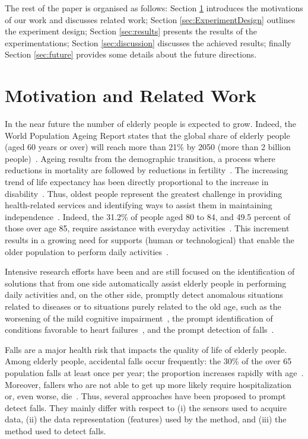 \documentclass[twocolumn]{svjour3}          \smartqed  \usepackage[draft]{hyperref}
\begin{document}
The rest of the paper is organised as follows: Section \ref{sec:related_work} introduces the motivations of our work and discusses related work; Section \ref{sec:ExperimentDesign} outlines the experiment design; Section \ref{sec:results} presents the results of the experimentations; Section \ref{sec:discussion} discusses the achieved results; finally Section \ref{sec:future} provides some details about the future directions. 
\section{Motivation and Related Work}
\label{sec:related_work}

In the near future the number of elderly people is expected to grow. Indeed, the World Population Ageing Report states that the global share of elderly people (aged 60 years or over) will reach more than 21\% by 2050 (more than 2 billion people)~\citep{WPA2013:website}. Ageing results from the demographic transition, a process where reductions in mortality are followed by reductions in fertility~\citep{WPA2013:website,carone_can_2006}. The increasing trend of life expectancy has been directly proportional to the increase in disability~\citep{karmarkar_prescription_2009}. Thus, oldest people represent the greatest challenge in providing health-related services and identifying ways to assist them in maintaining independence~\citep{mann_aging_2004}. Indeed, the 31.2\% of people aged 80 to 84, and 49.5 percent of those over age 85, require assistance with everyday activities~\citep{older_2012}. This increment results in a growing need for supports (human or technological) that enable the older population to perform daily activities~\citep{us_census_bureau_international_2013}.

Intensive research efforts have been and are still focused on the identification of solutions that from one side automatically assist elderly people in performing daily activities and, on the other side, promptly detect anomalous situations related to diseases or to situations purely related to the old age, such as the worsening of the mild cognitive impairment~\citep{acampora_survey_2013}, the prompt identification of conditions favorable to heart failures~\citep{deshmukh_wearable_2015}, and the prompt detection of falls~\citep{mubashir_survey_2013}.

Falls are a major health risk that impacts the quality of life of elderly people. Among elderly people, accidental falls occur frequently: the 30\% of the over 65 population falls at least once per year; the proportion increases rapidly with age~\citep{tromp2001}. Moreover, fallers who are not able to get up more likely require hospitalization or, even worse, die~\citep{tinetti1993}. Thus, several approaches have been proposed to prompt detect falls. They mainly differ with respect to (i) the sensors used to acquire data, (ii) the data representation (features) used by the method, and (iii) the method used to detect falls.
\end{document}
